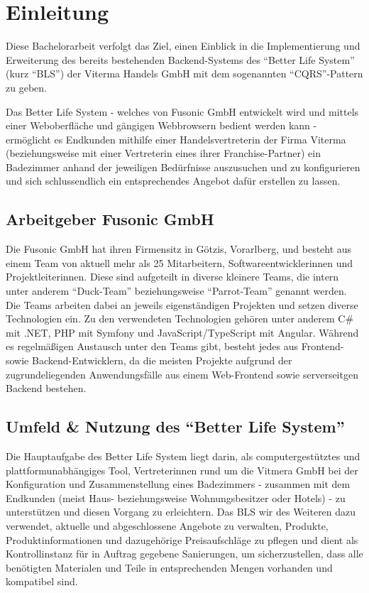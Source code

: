 \documentclass[a4paper,12pt,twoside]{scrreprt}
\begin{document}
\chapter{Einleitung}
Diese Bachelorarbeit verfolgt das Ziel, einen Einblick in die Implementierung und Erweiterung des bereits bestehenden Backend-Systems des \enquote{Better Life System} (kurz \enquote{BLS}) der Viterma Handels GmbH mit dem sogenannten \enquote{CQRS}-Pattern zu geben.

Das Better Life System - welches von Fusonic GmbH entwickelt wird und mittels einer Weboberfläche und gängigen Webbrowsern bedient werden kann - ermöglicht es Endkunden mithilfe einer Handelsvertreterin der Firma Viterma (beziehungsweise mit einer Vertreterin eines ihrer Franchise-Partner) ein Badezimmer anhand der jeweiligen Bedürfnisse auszusuchen und zu konfigurieren und sich schlussendlich ein entsprechendes Angebot dafür erstellen zu lassen.

\section{Arbeitgeber Fusonic GmbH}
Die Fusonic GmbH hat ihren Firmensitz in Götzis, Vorarlberg, und besteht aus einem Team von aktuell mehr als 25 Mitarbeitern, Softwareentwicklerinnen und Projektleiterinnen. Diese sind aufgeteilt in diverse kleinere Teams, die intern unter anderem \enquote{Duck-Team} beziehungsweise \enquote{Parrot-Team} genannt werden. Die Teams arbeiten dabei an jeweils eigenständigen Projekten und setzen diverse Technologien ein. Zu den verwendeten Technologien gehören unter anderem C\# mit .NET, PHP mit Symfony und JavaScript/TypeScript mit Angular. \parencite[vgl.]["Übersicht aller Technologien"]{fusonic_gmbh_web_nodate} Während es  regelmäßigen Austausch unter den Teams gibt, besteht jedes aus Frontend- sowie Backend-Entwicklern, da die meisten Projekte aufgrund der zugrundeliegenden Anwendungsfälle aus einem Web-Frontend sowie serverseitgen Backend bestehen.

\section{Umfeld \& Nutzung des \enquote{Better Life System}}
Die Hauptaufgabe des Better Life System liegt darin, als computergestütztes und plattformunabhängiges Tool, Vertreterinnen rund um die Vitmera GmbH bei der Konfiguration und Zusammenstellung eines Badezimmers - zusammen mit dem Endkunden (meist Haus- beziehungsweise Wohnungsbesitzer oder Hotels) - zu unterstützen und diesen Vorgang zu erleichtern. Das BLS wir des Weiteren dazu verwendet, aktuelle und abgeschlossene Angebote zu verwalten, Produkte, Produktinformationen und dazugehörige Preisaufschläge zu pflegen und dient als Kontrollinstanz für in Auftrag gegebene Sanierungen, um sicherzustellen, dass alle benötigten Materialen und Teile in entsprechenden Mengen vorhanden und kompatibel sind.
\end{document}
